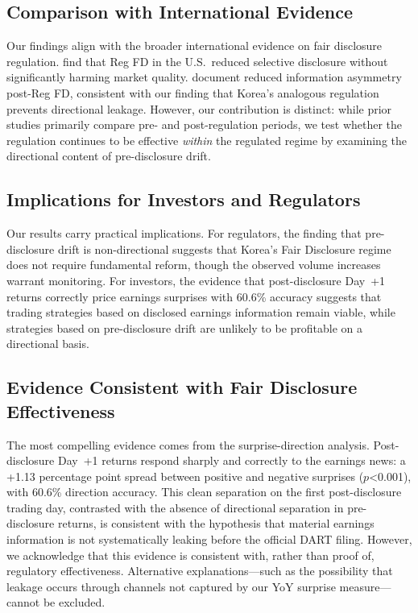 \documentclass[review,authoryear]{elsarticle}
\begin{document}
\subsection{Comparison with International Evidence}

Our findings align with the broader international evidence on fair disclosure regulation. \citet{bailey2003regulation} find that Reg FD in the U.S.\ reduced selective disclosure without significantly harming market quality. \citet{eleswarapu2004impact} document reduced information asymmetry post-Reg FD, consistent with our finding that Korea's analogous regulation prevents directional leakage. However, our contribution is distinct: while prior studies primarily compare pre- and post-regulation periods, we test whether the regulation continues to be effective \textit{within} the regulated regime by examining the directional content of pre-disclosure drift.

\subsection{Implications for Investors and Regulators}

Our results carry practical implications. For regulators, the finding that pre-disclosure drift is non-directional suggests that Korea's Fair Disclosure regime does not require fundamental reform, though the observed volume increases warrant monitoring. For investors, the evidence that post-disclosure Day~+1 returns correctly price earnings surprises with 60.6\% accuracy suggests that trading strategies based on disclosed earnings information remain viable, while strategies based on pre-disclosure drift are unlikely to be profitable on a directional basis.

\subsection{Evidence Consistent with Fair Disclosure Effectiveness}

The most compelling evidence comes from the surprise-direction analysis. Post-disclosure Day~+1 returns respond sharply and correctly to the earnings news: a +1.13 percentage point spread between positive and negative surprises ($p$<0.001), with 60.6\% direction accuracy. This clean separation on the first post-disclosure trading day, contrasted with the absence of directional separation in pre-disclosure returns, is consistent with the hypothesis that material earnings information is not systematically leaking before the official DART filing. However, we acknowledge that this evidence is consistent with, rather than proof of, regulatory effectiveness. Alternative explanations---such as the possibility that leakage occurs through channels not captured by our YoY surprise measure---cannot be excluded.
\end{document}
